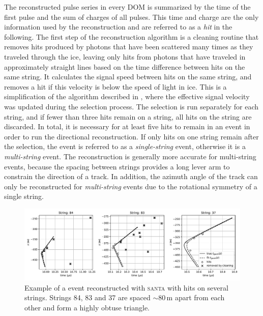 The reconstructed pulse series in every DOM is summarized by the time of the first pulse and the sum of charges of all pulses. This time and charge are the only information used by the reconstruction and are referred to as a \emph{hit} in the following. The first step of the reconstruction algorithm is a cleaning routine that removes hits produced
by photons that have been scattered many times as they traveled
through the ice, leaving only hits from photons that have traveled in approximately straight lines based on the time difference between hits on the same string.
It calculates the signal speed between hits on the same string, and removes a hit if this velocity is below the speed of light in ice. This is a simplification of the algorithm described in \cite{Garza2014Measurement}, where the effective signal velocity was updated during the selection process. The selection is run separately for each string, and if fewer than three hits remain on a string, all hits on the string are discarded. In total, it is necessary for at least five hits to remain in an event in order to run the directional reconstruction. If only hits on one string remain after the selection, the event is referred to as a \emph{single-string} event, otherwise it is a \emph{multi-string} event. The reconstruction is generally more accurate for multi-string events, because the spacing between strings provides a long lever arm to constrain the direction of a track. In addition, the azimuth angle of the track can only be reconstructed for \emph{multi-string} events due to the rotational symmetry of a single string.

\begin{figure}
    \centering
    \includegraphics[width=\linewidth]{figures/icecube/reconstruction/santa/multi_string_example_with_cleaning_id_12607962.pdf}
    \caption{Example of a \numucc event reconstructed with \textsc{santa} with hits on several strings. Strings 84, 83 and 37 are spaced $\sim80\,\mathrm{m}$ apart from each other and form a highly obtuse triangle.}
    \label{fig:santa-multi-string-example}
\end{figure}

